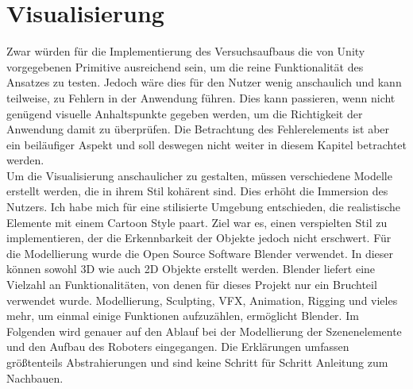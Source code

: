 \newpage
\section{Visualisierung}
\label{visualisierung}
Zwar würden für die Implementierung des Versuchsaufbaus die von Unity vorgegebenen Primitive ausreichend sein, um die reine Funktionalität des Ansatzes zu testen. Jedoch wäre dies für den Nutzer wenig anschaulich und kann teilweise, zu Fehlern in der Anwendung führen. Dies kann passieren, wenn nicht genügend visuelle Anhaltspunkte gegeben werden, um die Richtigkeit der Anwendung damit zu überprüfen. Die Betrachtung des Fehlerelements ist aber ein beiläufiger Aspekt und soll deswegen nicht weiter in diesem Kapitel betrachtet werden. 
\\
Um die Visualisierung anschaulicher zu gestalten, müssen verschiedene Modelle erstellt werden, die in ihrem Stil kohärent sind. Dies erhöht die Immersion des Nutzers. Ich habe mich für eine stilisierte Umgebung entschieden, die realistische Elemente mit einem Cartoon Style paart. Ziel war es, einen verspielten Stil zu implementieren, der die Erkennbarkeit der Objekte jedoch nicht erschwert. 
Für die Modellierung wurde die Open Source Software Blender verwendet. In dieser können sowohl 3D wie auch 2D Objekte erstellt werden. Blender liefert eine Vielzahl an Funktionalitäten, von denen für dieses Projekt nur ein Bruchteil verwendet wurde. Modellierung, Sculpting, VFX, Animation, Rigging und vieles mehr, um einmal einige Funktionen aufzuzählen, ermöglicht Blender.\cite{ble} Im Folgenden wird genauer auf den Ablauf bei der Modellierung der Szenenelemente und den Aufbau des Roboters eingegangen. Die Erklärungen umfassen größtenteils Abstrahierungen und sind keine Schritt für Schritt Anleitung zum Nachbauen.

